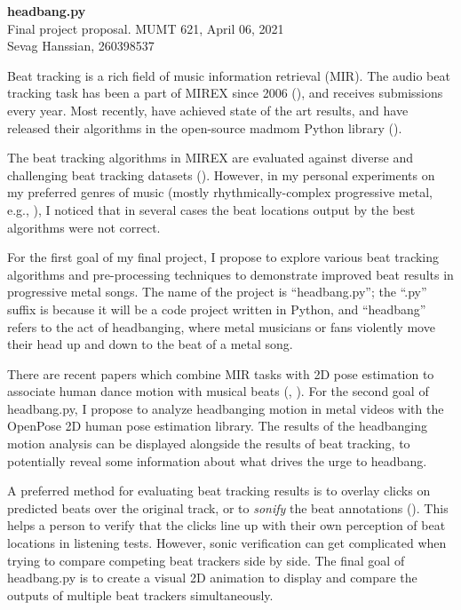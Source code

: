 \documentclass[letter,12pt]{report}
\begin{document}
\noindent\Large{\textbf{headbang.py}}\\
\large{Final project proposal. MUMT 621, April 06, 2021}\\
\large{Sevag Hanssian, 260398537}

\noindent\hrulefill

\vspace{2em}

Beat tracking is a rich field of music information retrieval (MIR). The audio beat tracking task has been a part of MIREX since 2006 (\cite{mirex06}), and receives submissions every year. Most recently, \textcite{bock1, bock2} have achieved state of the art results, and have released their algorithms in the open-source madmom Python library (\cite{madmom}).

The beat tracking algorithms in MIREX are evaluated against diverse and challenging beat tracking datasets (\cite{beatmeta}). However, in my personal experiments on my preferred genres of music (mostly rhythmically-complex progressive metal, e.g., \cite{meshuggah, periphery}), I noticed that in several cases the beat locations output by the best algorithms were not correct.

For the first goal of my final project, I propose to explore various beat tracking algorithms and pre-processing techniques to demonstrate improved beat results in progressive metal songs. The name of the project is ``headbang.py''; the ``.py'' suffix is because it will be a code project written in Python, and ``headbang'' refers to the act of headbanging, where metal musicians or fans violently move their head up and down to the beat of a metal song.

There are recent papers which combine MIR tasks with 2D pose estimation to associate human dance motion with musical beats (\cite{pose1}, \cite{pose2}). For the second goal of headbang.py, I propose to analyze headbanging motion in metal videos with the OpenPose 2D human pose estimation library. The results of the headbanging motion analysis can be displayed alongside the results of beat tracking, to potentially reveal some information about what drives the urge to headbang.

A preferred method for evaluating beat tracking results is to overlay clicks on predicted beats over the original track, or to \textit{sonify} the beat annotations (\cite{clicks}). This helps a person to verify that the clicks line up with their own perception of beat locations in listening tests. However, sonic verification can get complicated when trying to compare competing beat trackers side by side. The final goal of headbang.py is to create a visual 2D animation to display and compare the outputs of multiple beat trackers simultaneously.

\vfill
\clearpage

\printbibheading[title={\vspace{-3.5em}References},heading=bibnumbered]
\vspace{-1.5em}
\printbibliography[heading=none]
\end{document}
